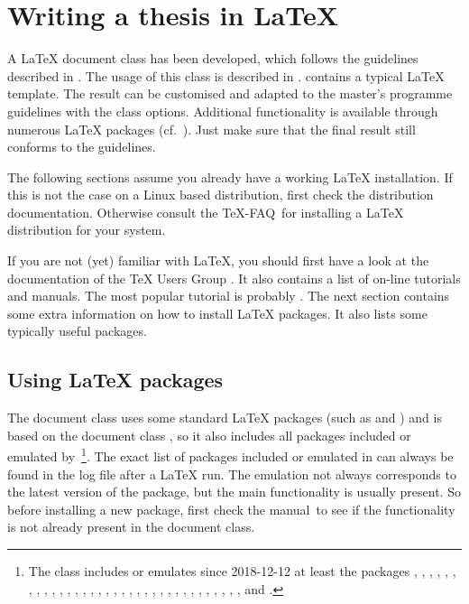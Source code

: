 \chapter{Writing a thesis in LaTeX}
A LaTeX document class has been developed, which follows the guidelines
described in \cite{kulemtgl}. The usage of this class is described in
.  contains a typical LaTeX template. The
result can be customised and adapted to the master's programme guidelines with
the class options. Additional functionality is available through numerous LaTeX
packages (cf.\ ). Just make sure that the final result still
conforms to the guidelines.

The following sections assume you already have a working LaTeX installation. If
this is not the case on a Linux based distribution, first check the
distribution documentation. Otherwise consult the TeX-FAQ\,\cite{texfaq} for
installing a LaTeX distribution for your system.

If you are not (yet) familiar with LaTeX, you should first have a look at the
documentation of the TeX Users Group \cite{tugstart}. It also contains a list
of on-line tutorials and manuals. The most popular tutorial is probably
. The next section contains some extra information on how
to install LaTeX packages. It also lists some typically useful packages.

\section{Using LaTeX packages}\label{sec:packages}
The document class  uses some standard LaTeX packages (such as
 and ) and is based on the document class
, so it also includes all packages included or emulated by
\,\footnote{The  class includes or emulates since
  2018-12-12 at least the packages , , ,
  , , , ,
  , , , , ,
  , , , , ,
  , , , ,
  , , , ,
  , , , , ,
  , , , , and
  .}. The exact list of packages included or emulated in
 can always be found in the log file after a LaTeX run. The
emulation not always corresponds to the latest version of the package, but the
main functionality is usually present. So before installing a new package,
first check the  manual\,\cite{memman} to see if the functionality
is not already present in the document class.

